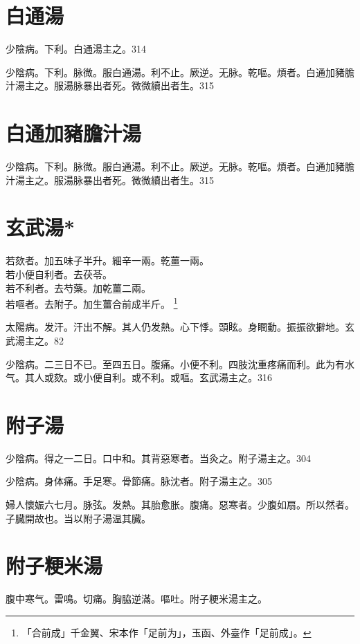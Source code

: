 \documentclass[b5paper,twoside,zihao=-4,UTF8]{ctexbook}
\begin{document}
\section{白通湯}

少陰病。下利。白通湯主之。314

少陰病。下利。脉微。服白通湯。利不止。厥逆。无脉。乾嘔。煩者。白通加豬膽汁湯主之。服湯脉暴出者死。微{微}續{出}者生。315

\section{白通加豬膽汁湯}

少陰病。下利。脉微。服白通湯。利不止。厥逆。无脉。乾嘔。煩者。白通加豬膽汁湯主之。服湯脉暴出者死。微{微}續{出}者生。315

\section{玄武湯*}

若欬者。加五味子半升。細辛一兩。乾薑一兩。\\
若小便自利者。去茯苓。\\
若不利者。去芍藥。加乾薑二兩。\\
若嘔者。去附子。加生薑合前成半斤。
	\footnote{「合前成」千金翼、宋本作「足前为」，玉函、外臺作「足前成」。}

太陽病。发汗。汗出不解。其人仍发熱。心下悸。頭眩。身瞤動。振振欲擗地。玄武湯主之。82

少陰病。二三日不已。至四五日。腹痛。小便不利。四肢沈重疼痛而利。此为有水气。其人或欬。或小便{自}利。或不利。或嘔。玄武湯主之。316

\section{附子湯}

少陰病。得之一二日。口中和。其背惡寒者。当灸之。附子湯主之。304

少陰病。身体痛。手足寒。骨節痛。脉沈者。附子湯主之。305

婦人懷娠六七月。脉弦。发熱。其胎愈胀。腹痛。惡寒者。少腹如扇。所以然者。子臓開故也。当以附子湯温其臓。

\section{附子粳米湯}

腹中寒气。雷鳴。切痛。胸脇逆滿。嘔吐。附子粳米湯主之。
\end{document}
